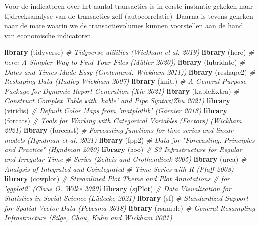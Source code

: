 \documentclass[
]{article}
\newenvironment{Shaded}{\begin{snugshade}}{\end{snugshade}}
\newcommand{\CommentTok}[1]{\textcolor[rgb]{0.56,0.35,0.01}{\textit{#1}}}
\newcommand{\KeywordTok}[1]{\textcolor[rgb]{0.13,0.29,0.53}{\textbf{#1}}}
\newcommand{\NormalTok}[1]{#1}
\begin{document}
Voor de indicatoren over het aantal transacties is in eerste instantie
gekeken naar tijdreeksanalyse van de transacties zelf (autocorrelatie).
Daarna is tevens gekeken naar de mate waarin we de transactievolumes
kunnen voorstellen aan de hand van economische indicatoren.

\begin{Shaded}
\begin{Highlighting}[]
\KeywordTok{library}\NormalTok{ (tidyverse)          }\CommentTok{# Tidyverse utilities (Wickham et al. 2019)}
\KeywordTok{library}\NormalTok{ (here)               }\CommentTok{# here: A Simpler Way to Find Your Files (Müller 2020))}
\KeywordTok{library}\NormalTok{ (lubridate)          }\CommentTok{# Dates and Times Made Easy (Grolemund, Wickham 2011))}
\KeywordTok{library}\NormalTok{ (reshape2)           }\CommentTok{# Reshaping Data (Hadley Wickham 2007)}
\KeywordTok{library}\NormalTok{ (knitr)              }\CommentTok{# A General-Purpose Package for Dynamic Report Generation (Xie 2021)}
\KeywordTok{library}\NormalTok{ (kableExtra)         }\CommentTok{# Construct Complex Table with 'kable' and Pipe Syntax(Zhu 2021)}
\KeywordTok{library}\NormalTok{ (viridis)            }\CommentTok{# Default Color Maps from 'matplotlib' (Garnier 2018)}
\KeywordTok{library}\NormalTok{ (forcats)            }\CommentTok{# Tools for Working with Categorical Variables (Factors) (Wickham 2021)}
\KeywordTok{library}\NormalTok{ (forecast)           }\CommentTok{# Forecasting functions for time series and linear models (Hyndman et al. 2021)}
\KeywordTok{library}\NormalTok{ (fpp2)               }\CommentTok{# Data for "Forecasting: Principles and Practice" (Hyndman 2020)}
\KeywordTok{library}\NormalTok{ (zoo)                }\CommentTok{# S3 Infrastructure for Regular and Irregular Time}
                             \CommentTok{# Series (Zeileis and Grothendieck 2005)}
\KeywordTok{library}\NormalTok{ (urca)               }\CommentTok{# Analysis of Integrated and Cointegrated }
                             \CommentTok{# Time Series with R (Pfaff 2008)}
\KeywordTok{library}\NormalTok{ (cowplot)            }\CommentTok{# Streamlined Plot Theme and Plot Annotations }
                             \CommentTok{# for 'ggplot2' (Claus O. Wilke 2020)}
\KeywordTok{library}\NormalTok{ (sjPlot)             }\CommentTok{# Data Visualization for Statistics in Social Science (Lüdecke 2021)}
\KeywordTok{library}\NormalTok{ (sf)                 }\CommentTok{# Standardized Support for Spatial Vector Data (Pebesma 2018)}
\KeywordTok{library}\NormalTok{ (rsample)            }\CommentTok{# General Resampling Infrastructure (Silge, Chow, Kuhn and Wickham 2021)}

\end{Highlighting}
\end{Shaded}
\end{document}
